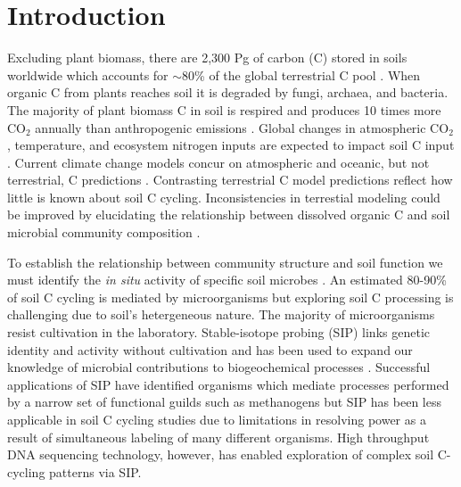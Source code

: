 \section{Introduction}
Excluding plant biomass, there are 2,300 Pg of carbon (C) stored in soils
worldwide which accounts for $\sim$80\% of the global terrestrial C pool
\citep{Amundson_2001,BATJES_1996}. When organic C from plants reaches soil it
is degraded by fungi, archaea, and bacteria.  The majority of plant biomass
C in soil is respired and produces 10 times more CO$_{2}$ annually than
anthropogenic emissions \citep{chapin2002principles}. Global
changes in atmospheric CO$_{2}$, temperature, and ecosystem nitrogen inputs are
expected to impact soil C input \citep{Groenigen_2006}. Current climate change
models concur on atmospheric and oceanic, but not terrestrial, C predictions
\citep{Friedlingstein_2006}. Contrasting terrestrial C model predictions
reflect how little is known about soil C cycling. Inconsistencies in
terrestial modeling could be improved by elucidating the relationship between
dissolved organic C and soil microbial community composition \citep{Neff_2001}.

To establish the relationship between community structure and soil function we
must identify the \textit{in situ} activity of specific soil microbes 
\citep{O_Donnell_2002}. An estimated 80-90\% of soil C cycling is
mediated by microorganisms \citep{ColemanCrossley_1996,Nannipieri_2003} but
exploring soil C processing is challenging due to soil's hetergeneous nature.
The majority of microorganisms resist cultivation in the laboratory.
Stable-isotope probing (SIP) links genetic identity and activity without
cultivation and has been used to expand our knowledge of microbial
contributions to biogeochemical processes \citep{Chen_Murrell_2010}. Successful
applications of SIP have identified organisms which mediate processes performed
by a narrow set of functional guilds such as methanogens \citep{Lu_2005} but
SIP has been less applicable in soil C cycling studies due to limitations in
resolving power as a result of simultaneous labeling of many different
organisms. High throughput DNA sequencing technology, however, has enabled
exploration of complex soil C-cycling patterns via SIP.

